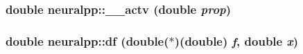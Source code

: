 \subsubsection[\_\-\_\-actv]{\setlength{\rightskip}{0pt plus 5cm}double neuralpp::\_\-\_\-actv (double {\em prop})}\label{namespaceneuralpp_7df3a0de999c7a635f2289749ed4f194}


\subsubsection[df]{\setlength{\rightskip}{0pt plus 5cm}double neuralpp::df (double($\ast$)(double) {\em f}, \/  double {\em x})}\label{namespaceneuralpp_43c8197cc83f65fa9676386579671aec}


